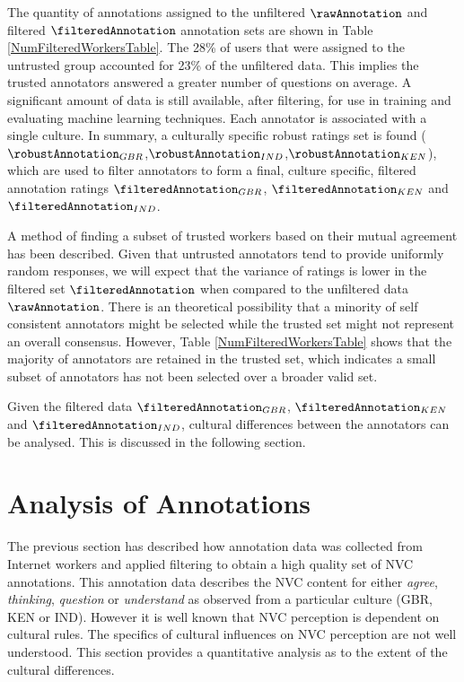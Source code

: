 The quantity of annotations assigned to the unfiltered $\rawAnnotation$ and filtered $\filteredAnnotation$ annotation sets are shown in Table \ref{NumFilteredWorkersTable}. The 28\% of users that were assigned to the untrusted group accounted for 23\% of the unfiltered data. This implies the trusted annotators answered a greater number of questions on average. A significant amount of data is still available, after filtering, for use in training and evaluating machine learning techniques. Each annotator is associated with a single culture. In summary, a culturally specific robust ratings set is found ($\robustAnnotation_{GBR}$,$\robustAnnotation_{IND}$,$\robustAnnotation_{KEN}$), which are used to filter annotators to form a final, culture specific, filtered annotation ratings $\filteredAnnotation_{GBR}$, $\filteredAnnotation_{KEN}$ and $\filteredAnnotation_{IND}$.


A method of finding a subset of trusted workers based on their mutual agreement has been described. Given that untrusted annotators tend to provide uniformly random responses, we will expect that the variance of ratings is lower in the filtered set $\filteredAnnotation$ when compared to the unfiltered data $\rawAnnotation$. There is an theoretical possibility that a minority of self consistent annotators might be selected while the trusted set might not represent an overall consensus. However, Table \ref{NumFilteredWorkersTable} shows that the majority of annotators are retained in the trusted set, which indicates a small subset of annotators has not been selected over a broader valid set.

Given the filtered data $\filteredAnnotation_{GBR}$, $\filteredAnnotation_{KEN}$ and $\filteredAnnotation_{IND}$, cultural differences between the annotators can be analysed. This is discussed in the following section.

\section{Analysis of Annotations}
\label{SectionAnalysisOfCultureAnnotation}

The previous section has described how annotation data was collected from Internet workers and applied filtering to obtain a high quality set of \ac{NVC} annotations. This annotation data describes the \ac{NVC} content for either \textit{agree}, \textit{thinking}, \textit{question} or \textit{understand} as observed from a particular culture (GBR, KEN or IND). However it is well known that \ac{NVC} perception is dependent on cultural rules. The specifics of cultural influences on \ac{NVC} perception are not well understood. This section provides a quantitative analysis as to the extent of the cultural differences.

